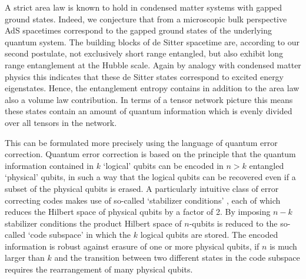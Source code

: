 \documentclass[a4paper,12pt]{article}
\begin{document}
A strict area law is known to hold in condensed matter systems 
with gapped ground states. Indeed, we conjecture that from a microscopic bulk perspective  AdS spacetimes correspond to the gapped ground states 
of the underlying quantum system.   The building blocks of de Sitter spacetime are, according to our second postulate, not exclusively short range entangled, but also exhibit long range entanglement at the Hubble scale. Again by analogy with condensed matter physics this indicates that these de Sitter states  correspond to excited energy eigenstates. Hence, the entanglement entropy contains in addition to the area law also a volume law contribution. In terms of a tensor network picture this means these states contain an amount of quantum information which is evenly divided over all tensors in the network. 


This can be formulated more precisely using the language of 
quantum error correction.  Quantum error correction is based on the principle that the quantum information contained in  $k$ `logical' qubits can be encoded in $n\!>\!k$ entangled `physical' qubits, in such a way that the logical qubits can be recovered even if a subset of the physical qubits is erased.   A particularly intuitive class of error correcting codes makes use of so-called `stabilizer conditions' \cite{Gottesman}, each of which reduces the Hilbert space of physical qubits by a factor of 2. By imposing $n-k$ stabilizer conditions %
 the product Hilbert space of $n$-qubits is reduced to the so-called `code subspace' in which the $k$ logical qubits are stored. %
 The encoded information is robust against erasure of one or more physical qubits, if $n$ is much larger than $k$ and the transition between two different states in the code subspace requires the rearrangement of many physical qubits. 
\end{document}
